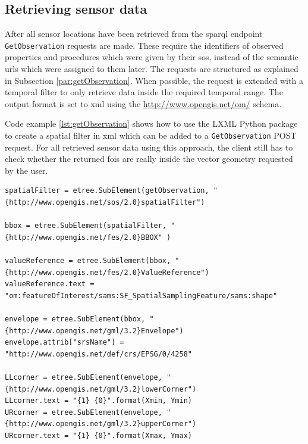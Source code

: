 \subsection{Retrieving sensor data}
\begin{sloppypar}
After all sensor locations have been retrieved from the \ac{sparql} endpoint \texttt{GetObservation} requests are made. These require the identifiers of observed properties and procedures which were given by their \ac{sos}, instead of the semantic \acp{url} which were assigned to them later. The requests are structured as explained in Subsection \ref{par:getObservation}. When possible, the request is extended with a temporal filter to only retrieve data inside the required temporal range. The output format is set to \ac{xml} using the \url{http://www.opengis.net/om/} schema.
\end{sloppypar}

Code example \ref{lst:getObservation} shows how to use the LXML Python package to create a spatial filter in \ac{xml} which can be added to a \texttt{GetObservation} POST request. For all retrieved sensor data using this approach, the client still has to check whether the returned \acp{foi} are really inside the vector geometry requested by the user. 

\begin{lstlisting}[float,caption={Script that creates an LXML graph object called spatialFilter to add to a \texttt{GetObservaton} POST request}, label={lst:getObservation}]
spatialFilter = etree.SubElement(getObservation, "{http://www.opengis.net/sos/2.0}spatialFilter")

bbox = etree.SubElement(spatialFilter, "{http://www.opengis.net/fes/2.0}BBOX" )

valueReference = etree.SubElement(bbox, "{http://www.opengis.net/fes/2.0}ValueReference")
valueReference.text = "om:featureOfInterest/sams:SF_SpatialSamplingFeature/sams:shape"

envelope = etree.SubElement(bbox, "{http://www.opengis.net/gml/3.2}Envelope")
envelope.attrib["srsName"] = "http://www.opengis.net/def/crs/EPSG/0/4258"

LLcorner = etree.SubElement(envelope, "{http://www.opengis.net/gml/3.2}lowerCorner")
LLcorner.text = "{1} {0}".format(Xmin, Ymin)
URcorner = etree.SubElement(envelope, "{http://www.opengis.net/gml/3.2}upperCorner")
URcorner.text = "{1} {0}".format(Xmax, Ymax)
\end{lstlisting}

